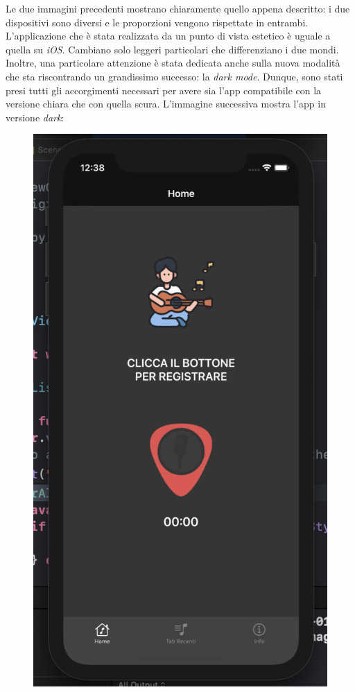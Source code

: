 Le due immagini precedenti mostrano chiaramente quello appena descritto: i due dispositivi sono diversi e le proporzioni vengono rispettate in entrambi.\\
\newline
L'applicazione che è stata realizzata da un punto di vista estetico è uguale a quella su \textit{iOS}. Cambiano solo leggeri particolari che differenziano i due mondi.\\
\newline
Inoltre, una particolare attenzione è stata dedicata anche sulla nuova modalità che sta riscontrando un grandissimo successo: la \textit{dark mode}. Dunque, sono stati presi tutti gli accorgimenti necessari per avere sia l'app compatibile con la versione chiara che con quella scura. L'immagine successiva mostra l'app in versione \textit{dark}:
\begin{figure}[H]
	\centering
	\includegraphics[scale=0.20]{./images/img10.png}
\end{figure}

